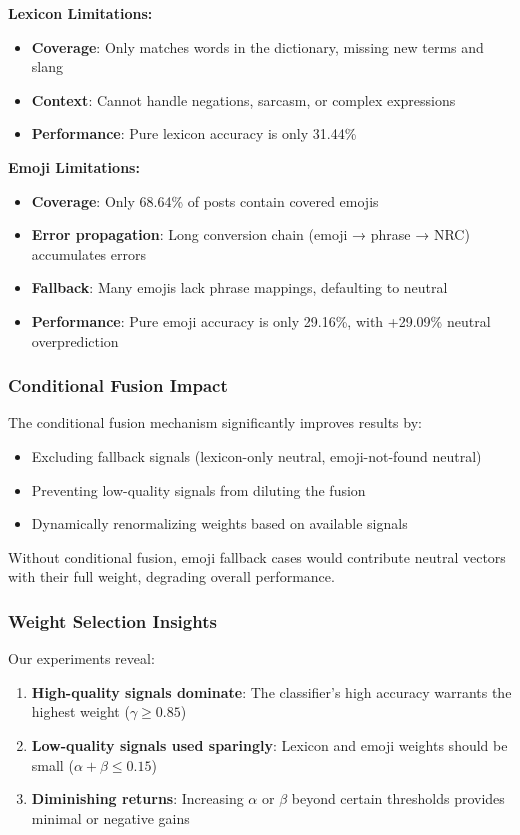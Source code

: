 \textbf{Lexicon Limitations:}
\begin{itemize}
    \item \textbf{Coverage}: Only matches words in the dictionary, missing new terms and slang
    \item \textbf{Context}: Cannot handle negations, sarcasm, or complex expressions
    \item \textbf{Performance}: Pure lexicon accuracy is only 31.44\%
\end{itemize}

\textbf{Emoji Limitations:}
\begin{itemize}
    \item \textbf{Coverage}: Only 68.64\% of posts contain covered emojis
    \item \textbf{Error propagation}: Long conversion chain (emoji → phrase → NRC) accumulates errors
    \item \textbf{Fallback}: Many emojis lack phrase mappings, defaulting to neutral
    \item \textbf{Performance}: Pure emoji accuracy is only 29.16\%, with +29.09\% neutral overprediction
\end{itemize}

\subsubsection{Conditional Fusion Impact}

The conditional fusion mechanism significantly improves results by:
\begin{itemize}
    \item Excluding fallback signals (lexicon-only neutral, emoji-not-found neutral)
    \item Preventing low-quality signals from diluting the fusion
    \item Dynamically renormalizing weights based on available signals
\end{itemize}

Without conditional fusion, emoji fallback cases would contribute neutral vectors with their full weight, degrading overall performance.

\subsubsection{Weight Selection Insights}

Our experiments reveal:
\begin{enumerate}
    \item \textbf{High-quality signals dominate}: The classifier's high accuracy warrants the highest weight ($\gamma \geq 0.85$)
    \item \textbf{Low-quality signals used sparingly}: Lexicon and emoji weights should be small ($\alpha + \beta \leq 0.15$)
    \item \textbf{Diminishing returns}: Increasing $\alpha$ or $\beta$ beyond certain thresholds provides minimal or negative gains
\end{enumerate}

